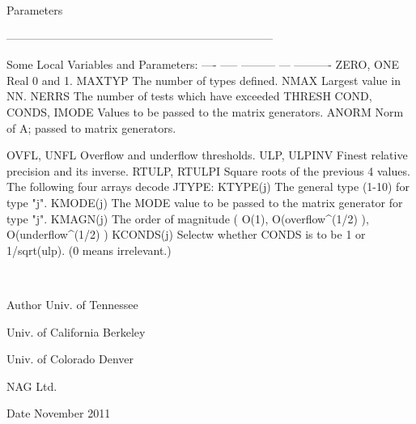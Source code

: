 \begin{DoxyParams}[1]{Parameters}
\begin{DoxyVerb}
-----------------------------------------------------------------------

     Some Local Variables and Parameters:
     ---- ----- --------- --- ----------
     ZERO, ONE       Real 0 and 1.
     MAXTYP          The number of types defined.
     NMAX            Largest value in NN.
     NERRS           The number of tests which have exceeded THRESH
     COND, CONDS,
     IMODE           Values to be passed to the matrix generators.
     ANORM           Norm of A; passed to matrix generators.

     OVFL, UNFL      Overflow and underflow thresholds.
     ULP, ULPINV     Finest relative precision and its inverse.
     RTULP, RTULPI   Square roots of the previous 4 values.
             The following four arrays decode JTYPE:
     KTYPE(j)        The general type (1-10) for type "j".
     KMODE(j)        The MODE value to be passed to the matrix
                     generator for type "j".
     KMAGN(j)        The order of magnitude ( O(1),
                     O(overflow^(1/2) ), O(underflow^(1/2) )
     KCONDS(j)       Selectw whether CONDS is to be 1 or
                     1/sqrt(ulp).  (0 means irrelevant.)\end{DoxyVerb}
 \\
\hline
\end{DoxyParams}
\begin{DoxyAuthor}{Author}
Univ. of Tennessee 

Univ. of California Berkeley 

Univ. of Colorado Denver 

N\+A\+G Ltd. 
\end{DoxyAuthor}
\begin{DoxyDate}{Date}
November 2011 
\end{DoxyDate}
\hypertarget{group__single__eig_ga91d3493bce6a97430fded1ad19b1bead}{}
